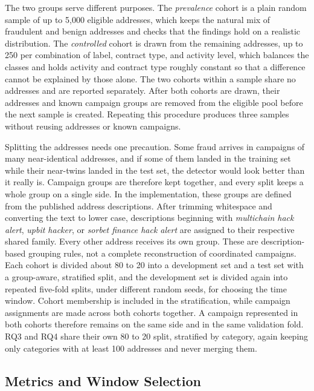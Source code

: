 \documentclass{thesisclass}
\begin{document}
The two groups serve different purposes. The \emph{prevalence} cohort is a plain
random sample of up to 5{,}000 eligible addresses, which keeps the natural mix of
fraudulent and benign addresses and checks that the findings hold on a realistic
distribution. The \emph{controlled} cohort is drawn from the remaining addresses,
up to 250 per combination of label, contract type, and activity level, which
balances the classes and holds activity and contract type roughly constant so that
a difference cannot be explained by those alone. The two cohorts within a
sample share no addresses and are reported separately. After both cohorts are
drawn, their addresses and known campaign groups are removed from the eligible
pool before the next sample is created. Repeating this procedure produces three
samples without reusing addresses or known campaigns.

Splitting the addresses needs one precaution. Some fraud arrives in campaigns of
many near-identical addresses, and if some of them landed in the training set
while their near-twins landed in the test set, the detector would look better than
it really is. Campaign groups are therefore kept together, and every split keeps
a whole group on a single side. In the implementation, these groups are defined
from the published address descriptions. After trimming whitespace and converting
the text to lower case, descriptions beginning with
\emph{multichain hack alert}, \emph{upbit hacker}, or
\emph{sorbet finance hack alert} are assigned to their respective shared
family. Every other address receives its own group. These are description-based
grouping rules, not a complete reconstruction of coordinated campaigns.
Each cohort is divided about
80 to 20 into a development set and a test set with a group-aware, stratified
split, and the development set is divided again into repeated five-fold splits,
under different random seeds, for choosing the time window. Cohort membership is
included in the stratification, while campaign assignments are made across both
cohorts together. A campaign represented in both cohorts therefore remains on
the same side and in the same validation fold. RQ3 and RQ4 share their own 80 to
20 split, stratified by category, again keeping only categories with at least 100
addresses and never merging them.

\subsection{Metrics and Window Selection}
\end{document}
